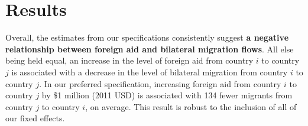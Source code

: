 \documentclass[12pt]{article}
\begin{document}
\section{Results}

Overall, the estimates from our specifications consistently suggest \textbf{a
negative relationship between foreign aid and bilateral migration flows}.  All
else being held equal, an increase in the level of foreign aid from country
\(i\) to country \(j\) is associated with a decrease in the level of bilateral
migration from country \(i\) to country \(j\).  In our preferred specification,
increasing foreign aid from country \(i\) to country \(j\) by \$1 million (2011
USD) is associated with 134 fewer migrants from country \(j\) to country \(i\),
on average.  This result is robust to the inclusion of all of our fixed effects.
\end{document}
